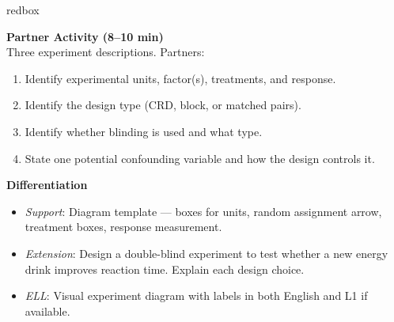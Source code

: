 \documentclass[10pt]{article}
\begin{document}
\begin{skillbox}{redbox}
\begin{minipage}[t]{0.48\linewidth}
    \textbf{Partner Activity (8--10 min)}\\
    Three experiment descriptions. Partners:
    \begin{enumerate}
        \item Identify experimental units, factor(s), treatments, and response.
        \item Identify the design type (CRD, block, or matched pairs).
        \item Identify whether blinding is used and what type.
        \item State one potential confounding variable and how the design controls it.
    \end{enumerate}
\end{minipage}
\hfill
\begin{minipage}[t]{0.48\linewidth}
    \textbf{Differentiation}
    \begin{itemize}
        \item \textit{Support}: Diagram template --- boxes for units, random
              assignment arrow, treatment boxes, response measurement.
        \item \textit{Extension}: Design a double-blind experiment to test whether a
              new energy drink improves reaction time. Explain each design choice.
        \item \textit{ELL}: Visual experiment diagram with labels in both English and
              L1 if available.
    \end{itemize}
\end{minipage}
\end{skillbox}
\end{document}
